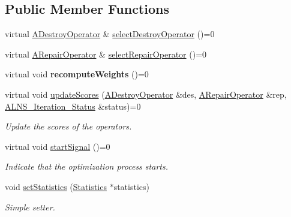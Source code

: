 \subsection*{\-Public \-Member \-Functions}
\begin{DoxyCompactItemize}
\item 
virtual \hyperlink{classADestroyOperator}{\-A\-Destroy\-Operator} \& \hyperlink{classAOperatorManager_a0bafced8312c2d88e7006c08881750bc}{select\-Destroy\-Operator} ()=0
\item 
virtual \hyperlink{classARepairOperator}{\-A\-Repair\-Operator} \& \hyperlink{classAOperatorManager_a4258cef17ecd22b63804448dfd38ebcc}{select\-Repair\-Operator} ()=0
\item 
\hypertarget{classAOperatorManager_a83386737e04f631132490d4156e3c867}{virtual void {\bfseries recompute\-Weights} ()=0}\label{classAOperatorManager_a83386737e04f631132490d4156e3c867}

\item 
\hypertarget{classAOperatorManager_afb87eb820180a129287658c9a55487a0}{virtual void \hyperlink{classAOperatorManager_afb87eb820180a129287658c9a55487a0}{update\-Scores} (\hyperlink{classADestroyOperator}{\-A\-Destroy\-Operator} \&des, \hyperlink{classARepairOperator}{\-A\-Repair\-Operator} \&rep, \hyperlink{classALNS__Iteration__Status}{\-A\-L\-N\-S\-\_\-\-Iteration\-\_\-\-Status} \&status)=0}\label{classAOperatorManager_afb87eb820180a129287658c9a55487a0}

\begin{DoxyCompactList}\small\item\em \-Update the scores of the operators. \end{DoxyCompactList}\item 
\hypertarget{classAOperatorManager_afa1d2921a30cbd68c5fcaf1e76715a0f}{virtual void \hyperlink{classAOperatorManager_afa1d2921a30cbd68c5fcaf1e76715a0f}{start\-Signal} ()=0}\label{classAOperatorManager_afa1d2921a30cbd68c5fcaf1e76715a0f}

\begin{DoxyCompactList}\small\item\em \-Indicate that the optimization process starts. \end{DoxyCompactList}\item 
\hypertarget{classAOperatorManager_a838ee98f924be1924830e836889a00cb}{void \hyperlink{classAOperatorManager_a838ee98f924be1924830e836889a00cb}{set\-Statistics} (\hyperlink{classStatistics}{\-Statistics} $\ast$statistics)}\label{classAOperatorManager_a838ee98f924be1924830e836889a00cb}

\begin{DoxyCompactList}\small\item\em \-Simple setter. \end{DoxyCompactList}\end{DoxyCompactItemize}
